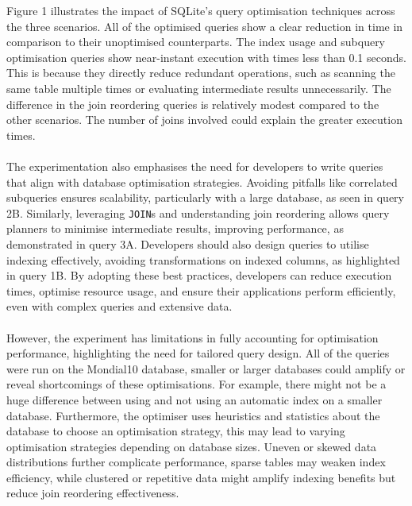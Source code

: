 \documentclass[11pt]{article}
\begin{document}
Figure 1 illustrates the impact of SQLite's query optimisation techniques across the three scenarios. All of the optimised queries show a clear
reduction in time in comparison to their unoptimised counterparts. The index usage and subquery optimisation queries show near-instant execution with times less than 0.1 seconds. This is because they directly reduce
redundant operations, such as scanning the same table multiple times or evaluating intermediate results unnecessarily.
The difference in the join reordering queries is relatively modest compared to the other scenarios. The number of joins involved could explain
the greater execution times.
\\ \\
The experimentation also emphasises the need for developers to write queries that align with database optimisation strategies. Avoiding pitfalls like correlated subqueries ensures scalability,
particularly with a large database, as seen in query 2B. Similarly, leveraging \texttt{JOIN}s and understanding join reordering allows query planners to minimise intermediate results, improving performance,
as demonstrated in query 3A. Developers should also design queries to utilise indexing effectively, avoiding transformations on indexed columns, as highlighted in query 1B. By adopting these best practices,
developers can reduce execution times, optimise resource usage, and ensure their applications perform efficiently, even with complex queries and extensive data.
\\ \\
However, the experiment has limitations in fully accounting for optimisation performance, highlighting the need for tailored query design. All of the queries were run on the Mondial10 database, smaller
or larger databases could amplify or reveal shortcomings of these optimisations. For example, there might not be a huge difference between using and not using
an automatic index on a smaller database. Furthermore, the optimiser uses heuristics and statistics about the database to choose an optimisation
strategy, this may lead to varying optimisation strategies depending on database sizes. Uneven or skewed data distributions further complicate performance, sparse tables may weaken index efficiency,
while clustered or repetitive data might amplify indexing benefits but reduce join reordering effectiveness.
\end{document}
